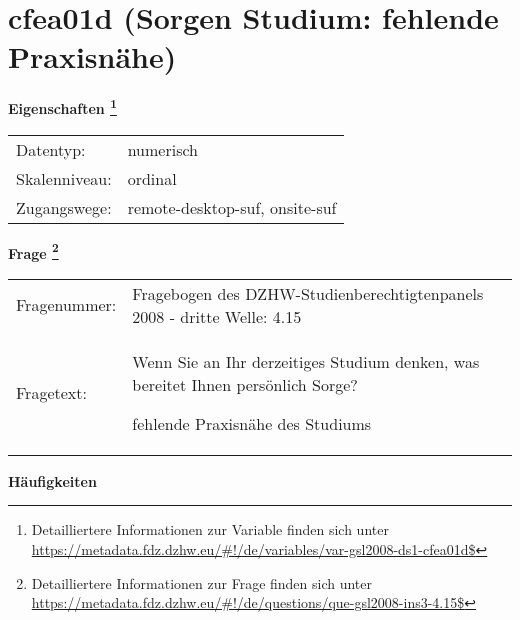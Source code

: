 
    \setcounter{footnote}{0}

    \vspace*{-1.8cm}
	\section{cfea01d (Sorgen Studium: fehlende Praxisnähe)}
	\label{section:cfea01d}



    \vspace*{0.5cm}
    \noindent\textbf{Eigenschaften
	\footnote{Detailliertere Informationen zur Variable finden sich unter
		\url{https://metadata.fdz.dzhw.eu/\#!/de/variables/var-gsl2008-ds1-cfea01d$}}}\\
	\begin{tabularx}{\hsize}{@{}lX}
	Datentyp: & numerisch \\
	Skalenniveau: & ordinal \\
	Zugangswege: &
	  remote-desktop-suf, 
	  onsite-suf
 \\
    \end{tabularx}



				\vspace*{0.5cm}
                \noindent\textbf{Frage
	                \footnote{Detailliertere Informationen zur Frage finden sich unter
		              \url{https://metadata.fdz.dzhw.eu/\#!/de/questions/que-gsl2008-ins3-4.15$}}}\\
				\begin{tabularx}{\hsize}{@{}lX}
					Fragenummer: &
					  Fragebogen des DZHW-Studienberechtigtenpanels 2008 - dritte Welle:
					  4.15
 \\
					Fragetext: & Wenn Sie an Ihr derzeitiges Studium denken, was bereitet Ihnen persönlich Sorge?\par  fehlende Praxisnähe des Studiums \\
				\end{tabularx}





        		\vspace*{0.5cm}
                \noindent\textbf{Häufigkeiten}

